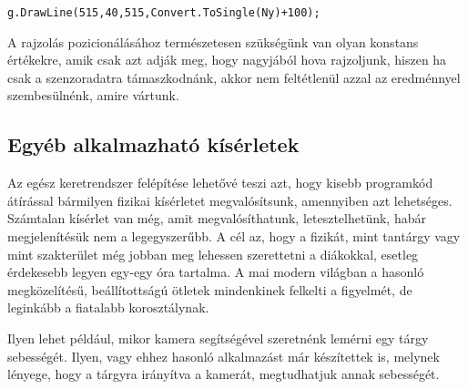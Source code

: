 \documentclass{thesis-ekf}
\theoremstyle{definition}
\theoremstyle{remark}
\begin{document}
 \begin{lstlisting}
g.DrawLine(515,40,515,Convert.ToSingle(Ny)+100);
 \end{lstlisting}
\par A rajzolás pozicionálásához természetesen szükségünk van olyan konstans értékekre, amik csak azt adják meg, hogy nagyjából hova rajzoljunk, hiszen ha csak a szenzoradatra támaszkodnánk, akkor nem feltétlenül azzal az eredménnyel szembesülnénk, amire vártunk.
\subsection{Egyéb alkalmazható kísérletek}
Az egész keretrendszer felépítése lehetővé teszi azt, hogy kisebb programkód átírással bármilyen fizikai kísérletet megvalósítsunk, amennyiben azt lehetséges. Számtalan kísérlet van még, amit megvalósíthatunk, letesztelhetünk, habár megjelenítésük nem a legegyszerűbb. A cél az, hogy a fizikát, mint tantárgy vagy mint szakterület még jobban meg lehessen szerettetni a diákokkal, esetleg érdekesebb legyen egy-egy óra tartalma. A mai modern világban a hasonló megközelítésű, beállítottságú ötletek mindenkinek felkelti a figyelmét, de leginkább a fiatalabb korosztálynak.
\par Ilyen lehet például, mikor kamera segítségével szeretnénk lemérni egy tárgy sebességét. Ilyen, vagy ehhez hasonló alkalmazást már készítettek is, melynek lényege, hogy a tárgyra irányítva a kamerát, megtudhatjuk annak sebességét.
\end{document}
